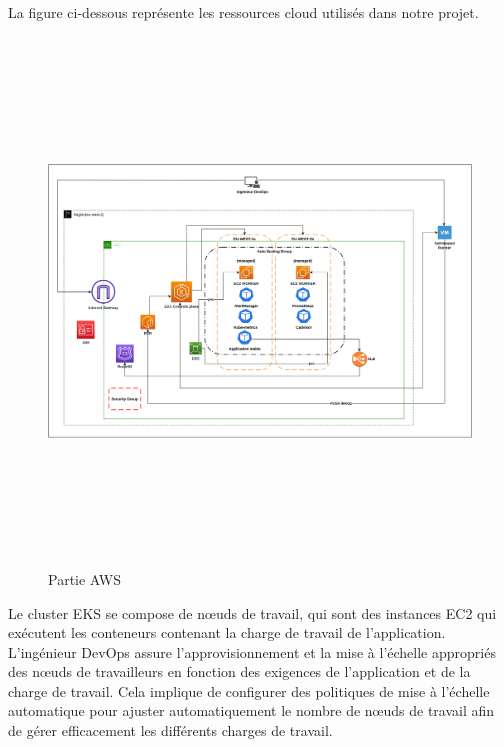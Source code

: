  
 \\
La figure ci-dessous représente les ressources cloud utilisés dans notre projet.
\begin{figure}[H]


  \includegraphics[width=18cm,height=14cm]{PARTIEEKS.drawio.png}
  
    \caption{Partie AWS}
  \end{figure}
  \indent
 Le cluster EKS se compose de nœuds de travail, qui sont des instances EC2 qui exécutent les conteneurs contenant la charge de travail de l’application. L’ingénieur DevOps assure l’approvisionnement et la mise à l’échelle appropriés des nœuds de travailleurs en fonction des exigences de l’application et de la charge de travail. Cela implique de configurer des politiques de mise à l’échelle automatique pour ajuster automatiquement le nombre de nœuds de travail afin de gérer efficacement les différents charges de travail.
 \\[0.01cm]
 \indent

